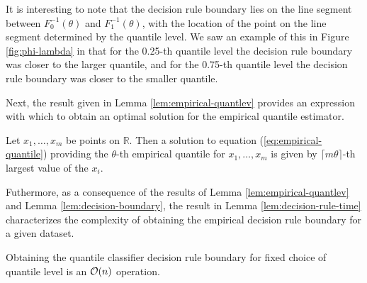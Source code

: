 It is interesting to note that the decision rule boundary lies on the line
segment between $F_0^{-1}(\theta)$ and $F_1^{-1}(\theta)$, with the location of
the point on the line segment determined by the quantile level.  We saw an
example of this in Figure \ref{fig:phi-lambda} in that for the 0.25-th quantile
level the decision rule boundary was closer to the larger quantile, and for the
0.75-th quantile level the decision rule boundary was closer to the smaller
quantile.

Next, the result given in Lemma \ref{lem:empirical-quantlev} provides an
expression with which to obtain an optimal solution for the empirical quantile
estimator.  

\begin{lemma}
  \label{lem:empirical-quantlev}
  Let $x_1, \dots, x_m$ be points on $\mathbb{R}$.  Then a solution to equation
  (\ref{eq:empirical-quantile}) providing the $\theta$-th empirical quantile for
  $x_1, \dots, x_m$ is given by $\lceil m \theta \rceil$-th largest value of the
  $x_i$.
\end{lemma}


Futhermore, as a consequence of the results of Lemma
\ref{lem:empirical-quantlev} and Lemma \ref{lem:decision-boundary}, the result
in Lemma \ref{lem:decision-rule-time} characterizes the complexity of obtaining
the empirical decision rule boundary for a given dataset.

\begin{lemma}
  \label{lem:decision-rule-time}
  Obtaining the quantile classifier decision rule boundary for fixed choice of
  quantile level is an $\mathcal{O}(n)$ operation.
\end{lemma}






